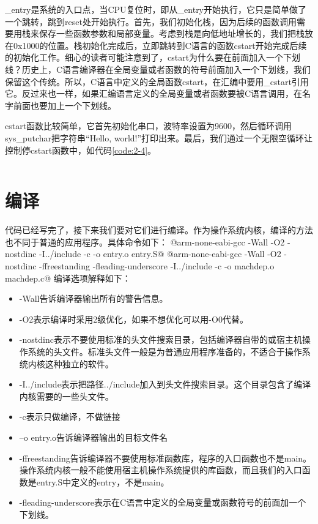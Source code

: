 \documentclass[main.tex]{subfiles}
\begin{document}
\begin{CJK*}{UTF8}{song}
\begin{code}
\label{code:2-3}
\inputminted[linenos,numbersep=5pt,frame=lines,framesep=2mm]{gas}{src/chapter02/kernel/entry.S}
\end{code}


\_entry是系统的入口点，当CPU复位时，即从\_entry开始执行，它只是简单做了一个跳转，跳到reset处开始执行。首先，我们初始化栈，因为后续的函数调用需要用栈来保存一些函数参数和局部变量。考虑到栈是向低地址增长的，我们把栈放在0x1000的位置。栈初始化完成后，立即跳转到C语言的函数cstart开始完成后续的初始化工作。细心的读者可能注意到了，cstart为什么要在前面加入一个下划线？历史上，C语言编译器在全局变量或者函数的符号前面加入一个下划线，我们保留这个传统。所以，C语言中定义的全局函数cstart，在汇编中要用\_cstart引用它。反过来也一样，如果汇编语言定义的全局变量或者函数要被C语言调用，在名字前面也要加上一个下划线。

\par
cstart函数比较简单，它首先初始化串口，波特率设置为9600，然后循环调用sys\_putchar把字符串“Hello, world!”打印出来。最后，我们通过一个无限空循环让控制停cstart函数中，如代码\ref{code:2-4}。

\begin{code}
\label{code:2-4}
\inputminted[firstline=50,lastline=60,linenos,numbersep=5pt,frame=lines,framesep=2mm]{c}{src/chapter02/kernel/machdep.c}
\end{code}


\section{编译}
代码已经写完了，接下来我们要对它们进行编译。作为操作系统内核，编译的方法也不同于普通的应用程序。具体命令如下：
@arm-none-eabi-gcc -Wall -O2 -nostdinc -I../include -c -o entry.o entry.S@
@arm-none-eabi-gcc -Wall -O2 -nostdinc -ffreestanding -fleading-underscore -I../include -c -o machdep.o machdep.c@
\noindent
编译选项解释如下：
\begin{itemize}
	\item -Wall告诉编译器输出所有的警告信息。
	\item -O2表示编译时采用2级优化，如果不想优化可以用-O0代替。
	\item -nostdinc表示不要使用标准的头文件搜索目录，包括编译器自带的或宿主机操作系统的头文件。标准头文件一般是为普通应用程序准备的，不适合于操作系统内核这种独立的软件。
	\item -I../include表示把路径../include加入到头文件搜索目录。这个目录包含了编译内核需要的一些头文件。
	\item -c表示只做编译，不做链接
	\item –o entry.o告诉编译器输出的目标文件名
	\item -ffreestanding告诉编译器不要使用标准函数库，程序的入口函数也不是main。操作系统内核一般不能使用宿主机操作系统提供的库函数，而且我们的入口函数是entry.S中定义的entry，不是main。
	\item -fleading-underscore表示在C语言中定义的全局变量或函数符号的前面加一个下划线。
\end{itemize}


\end{CJK*}
\end{document}
